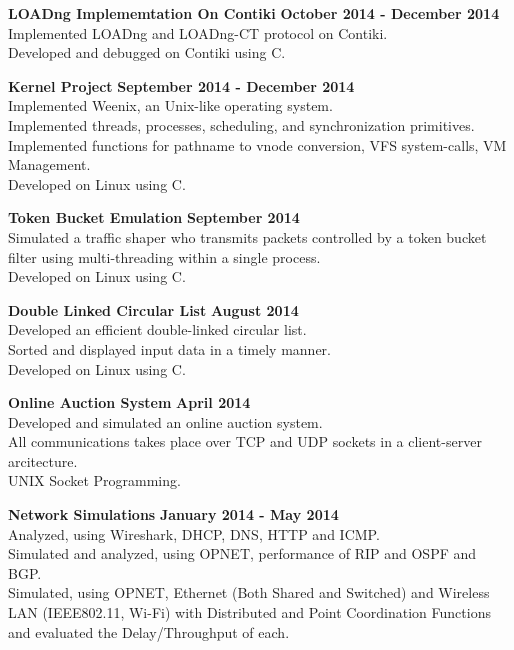 \documentclass[margin,line]{resume}
\begin{document}
\begin{resume}
    \textbf{\listing LOADng Implememtation On Contiki} \hfill \textbf{October 2014 - December 2014}\vspace{1mm}\\
    Implemented LOADng and LOADng-CT protocol on Contiki.\\
    Developed and debugged on Contiki using C.  

    \textbf{\listing Kernel Project} \hfill \textbf{September 2014 - December 2014}\vspace{2mm}\\
    Implemented Weenix, an Unix-like operating system.\\
	Implemented threads, processes, scheduling, and synchronization primitives.\\
	Implemented functions for pathname to vnode conversion, VFS system-calls, VM Management.\\
	Developed on Linux using C. 

    \textbf{\listing Token Bucket Emulation} \hfill \textbf{September 2014}\vspace{2mm}\\
    Simulated a traffic shaper who transmits packets controlled by a token bucket filter using multi-threading within a single process.\\
    Developed on Linux using C.    

    \textbf{\listing Double Linked Circular List} \hfill \textbf{August 2014}\vspace{2mm}\\
    Developed an efficient double-linked circular list.\\
    Sorted and displayed input data in a timely manner.\\
    Developed on Linux using C.

    \textbf{\listing Online Auction System} \hfill \textbf{April 2014}\vspace{2mm}\\
    Developed and simulated an online auction system.\\
    All communications takes place over TCP and UDP sockets in a client-server arcitecture.\\
    UNIX Socket Programming.
    
    \textbf{\listing Network Simulations} \hfill \textbf{January 2014 - May 2014}\vspace{2mm}\\
    Analyzed, using Wireshark, DHCP, DNS, HTTP and ICMP.\\
    Simulated and analyzed, using OPNET, performance of RIP and OSPF and BGP.\\
    Simulated, using OPNET, Ethernet (Both Shared and Switched) and Wireless LAN (IEEE802.11, Wi-Fi) with Distributed and Point Coordination Functions and evaluated the Delay/Throughput of each.
    

\end{resume}
\end{document}
